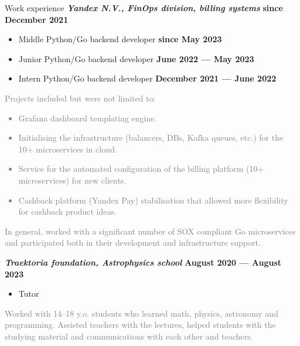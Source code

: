 \documentclass{resume} %
\newcommand{\timestamp}[1]{\hfill {\small \textbf{#1}}}
\newcommand{\datedsubheader}[2]{\textbf{\textit{#1}} \timestamp{#2}}
\newcommand{\longversion}[1]{\ifdefined\LONG#1\fi}
\newcommand{\note}[1]{\textcolor{gray}{#1}}
\begin{document}
	\begin{rSection}{Work experience}
		\datedsubheader{Yandex N.V., FinOps division, billing systems}{since December 2021}
		\begin{itemize}
			\item Middle Python/Go backend developer \timestamp{since May 2023}
			\item Junior Python/Go backend developer \timestamp{June 2022 --- May 2023}
			\item Intern Python/Go backend developer \timestamp{December 2021 --- June 2022}
		\end{itemize}
		\longversion{
			\note{
				Projects included but were not limited to:
				\begin{itemize}
					\item Grafana dashboard templating engine.
					\item Initialising the infrastructure (balancers, DBs, Kafka queues, etc.) for the 10+ microservices in cloud.
					\item Service for the automated configuration of the billing platform (10+ microservices) for new clients.
					\item Cashback platform (Yandex Pay) stabilisation that allowed more flexibility for cashback product ideas.
				\end{itemize}
				In general, worked with a significant number of SOX compliant Go microservices and participated both in their development and infrastructure support.
			}
		}

		\vspace{1em}

		\datedsubheader{Traektoria foundation, Astrophysics school}{August 2020 --- August 2023}
		\begin{itemize}
			\item Tutor
		\end{itemize}
		\longversion{
			\note{Worked with 14--18 y.o. students who learned math, physics, astronomy and programming.
			Assisted teachers with the lectures, helped students with the studying material and communications with each other and teachers.}
		}
    \end{rSection}
	
\end{document}
